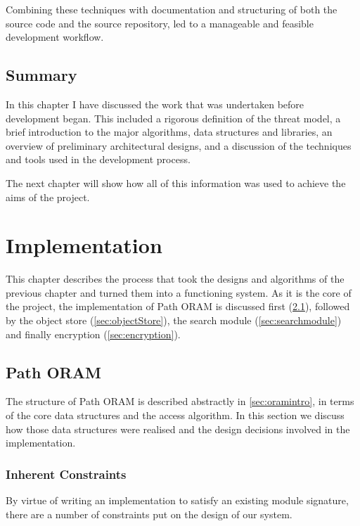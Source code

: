 \documentclass[12pt,a4paper,twoside,openright]{report}
\begin{document}
Combining these techniques with documentation and structuring of both the source code and the source repository, led to a manageable and feasible development workflow.

\section{Summary}

In this chapter I have discussed the work that was undertaken before development began. This included a rigorous definition of the threat model, a brief introduction to the major algorithms, data structures and libraries, an overview of preliminary architectural designs, and a discussion of the techniques and tools used in the development process.

The next chapter will show how all of this information was used to achieve the aims of the project.

\chapter{Implementation}

This chapter describes the process that took the designs and algorithms of the previous chapter and turned them into a functioning system. As it is the core of the project, the implementation of Path ORAM is discussed first (\cref{sec:pathORAM}), followed by the object store (\cref{sec:objectStore}), the search module (\cref{sec:searchmodule}) and finally encryption (\cref{sec:encryption}).


\section{Path ORAM}
\label{sec:pathORAM}

The structure of Path ORAM is described abstractly in \cref{sec:oramintro}, in terms of the core data structures and the access algorithm. In this section we discuss how those data structures were realised and the design decisions involved in the implementation.

\subsection{Inherent Constraints}
\label{subsec:constraints}

By virtue of writing an implementation to satisfy an existing module signature, there are a number of constraints put on the design of our system.
\end{document}
